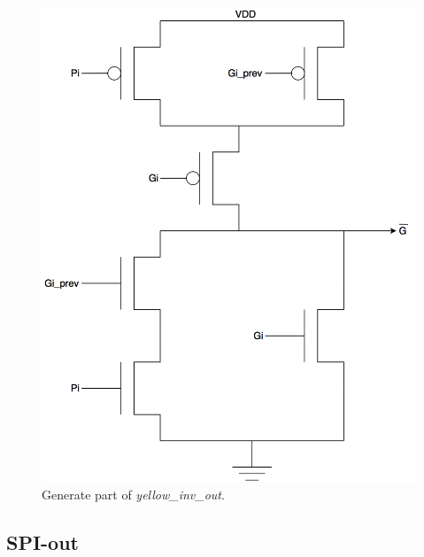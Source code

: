 \begin{figure}[H]
  \centering
  \captionsetup{justification=centering}
  \includegraphics[scale=0.15]{../figures/G_inv_out}
  \caption{Generate part of \textit{yellow\_inv\_out}.} \label{fig:G_inv_out}
\end{figure}

\subsection{SPI-out}
